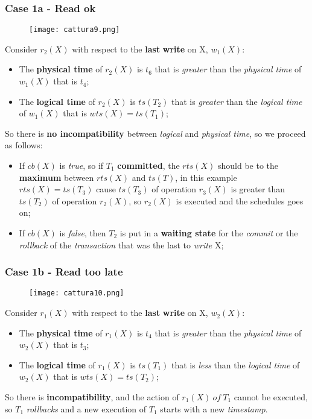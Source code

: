 \documentclass{article}
\begin{document}
\subsubsection {Case 1a - Read ok}
\begin{figure}[H]
  \centering
  \texttt{[image: cattura9.png]}
\end{figure}
Consider $r_2(X)$ with respect to the \textbf{last} \textbf{write} on X, $w_1(X)$:
\begin{itemize}
\item The \textbf{physical time} of $r_2(X)$ is $t_6$ that is \emph{greater} than the \emph{physical time} of $w_1(X)$ that is $t_4$;
\item The \textbf{logical time} of $r_2(X)$ is $ts(T_2)$ that is \emph{greater} than the \emph{logical time }of $w_1(X)$ that is $wts(X) = ts(T_1)$;
\end{itemize}
So there is \textbf{no incompatibility} between \emph{logical} and \emph{physical time}, so we proceed as follows:
\begin{itemize}
\item If $cb(X)$ is \emph{true}, so if $T_1$ \textbf{committed}, the $rts(X)$ should be to the \textbf{maximum} between $rts(X)$ and $ts(T)$, in this example $rts(X) = ts(T_3)$ cause $ts(T_3)$ of operation $r_3(X)$ is greater than $ts(T_2)$ of operation $r_2(X)$, so $r_2(X)$ is executed and the schedules goes on;
\item If $cb(X)$ is \emph{false}, then $T_2$ is put in a \textbf{waiting state} for the \emph{commit} or the \emph{rollback} of the \emph{transaction} that was the last to \emph{write} X;
\end{itemize}
\subsubsection {Case 1b - Read too late}
\begin{figure}[H]
  \centering
  \texttt{[image: cattura10.png]}
\end{figure}
Consider $r_1(X)$ with respect to the \textbf{last} \textbf{write} on X, $w_2(X)$:
\begin{itemize}
\item The \textbf{physical time} of $r_1(X)$ is $t_4$ that is \emph{greater} than the \emph{physical time} of $w_2(X)$ that is $t_3$;
\item The \textbf{logical time} of $r_1(X)$ is $ts(T_1)$ that is \emph{less} than the \emph{logical time} of $w_2(X)$ that is $wts(X) = ts(T_2)$;
\end{itemize}
So there is \textbf{incompatibility}, and the action of $r_1(X)\ of\ T_1$ cannot be executed, so $T_1$ \emph{rollbacks} and a new execution of $T_1$ starts with a new \emph{timestamp}. 
\end{document}
